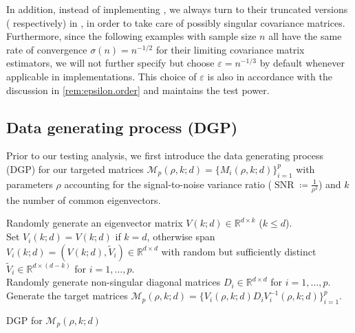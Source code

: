 \documentclass[12pt]{article}
\newcommand{\R}{\mathbb{R}}
\numberwithin{thm}{section}
\numberwithin{defn}{section}
\numberwithin{lem}{section}
\numberwithin{prop}{section}
\numberwithin{cor}{section}
\numberwithin{rem}{section}
\DeclareMathOperator{\SNR}{SNR}
\begin{document}
In addition, instead of implementing , we always turn to their truncated versions ( respectively) in , in order to take care of possibly singular covariance matrices. Furthermore, since the following examples with sample size $n$ all have the same rate of convergence $\sigma(n) = n^{-1/2}$ for their limiting covariance matrix estimators, we will not further specify but choose $\varepsilon = n^{-1/3}$ by default whenever applicable in implementations. This choice of $\varepsilon$ is also in accordance with the discussion in \autoref{rem:epsilon.order} and maintains the test power.

\vspace{-0.5cm}
\subsection{Data generating process (DGP)}\label{subse:DGP}
\vspace{-0.3cm}
Prior to our testing analysis, we first introduce the data generating process (DGP) for our targeted matrices $\mathcal{M}_p(\rho, k; d) = \{M_i(\rho, k; d)\}_{i=1}^p$ with parameters $\rho$ accounting for the signal-to-noise variance ratio ($\SNR \coloneqq \frac{1}{\rho^2}$) and $k$ the number of common eigenvectors.




\begin{algorithm}[htbp]
    Randomly generate an eigenvector matrix $V(k; d) \in \R^{d \times k}$ ($k \le d$).\label{step:commonV}\\
    Set $V_i(k; d) = V(k; d)$ if $k = d$, otherwise span $V_i(k; d) = (V(k; d), \widetilde{V}_i) \in \R^{d \times d}$ with random but sufficiently distinct $\widetilde{V}_i \in \R^{d \times (d-k)}$ for $i = 1, \dots, p$.\\
    Randomly generate non-singular diagonal matrices $D_i \in \R^{d \times d}$ for $i = 1, \dots, p$.\\
    Generate the target matrices $\mathcal{M}_p(\rho, k; d) = \{ V_i(\rho, k; d) D_i V_i^{-1}(\rho, k; d)\}_{i=1}^p$.
    \caption{DGP for $\mathcal{M}_p(\rho, k; d)$}\label{algo:DGP}
\end{algorithm}
\end{document}

